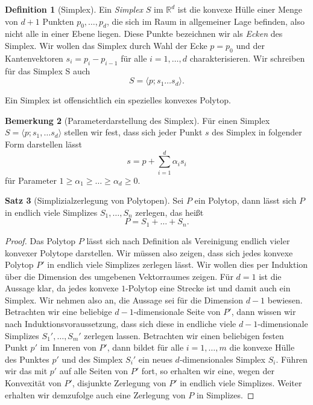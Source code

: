 \documentclass[11pt,titlepage]{article}
\newcommand{\setR}{\mathbb{R}}
\theoremstyle{definition}
\newtheorem{theorem}{Satz}[section]
\newtheorem{definition}[theorem]{Definition}
\newtheorem{remark}[theorem]{Bemerkung}
\theoremstyle{remark}
\begin{document}
	\begin{definition}[Simplex]\label{def:simplex}
		Ein \textsl{Simplex} $S$ im $\setR^d$ ist die konvexe Hülle einer Menge von 
		$d+1$ Punkten 
		$p_0,\ldots,p_d$, die sich im Raum in allgemeiner Lage befinden, also 
		nicht alle in einer Ebene liegen. Diese Punkte bezeichnen wir als 
		\textsl{Ecken} des Simplex. Wir wollen das Simplex durch Wahl der 
		Ecke $p=p_0$ und der Kantenvektoren 
		$s_i=p_i -p_{i-1}$ für alle $i=1,\ldots,d$ charakterisieren. 
		Wir schreiben für das Simplex S auch
		\[S=\langle p;s_1\ldots s_d\rangle.\]
	\end{definition}
	
	Ein Simplex ist offensichtlich ein spezielles konvexes Polytop. 
	
	\begin{remark}[Parameterdarstellung des Simplex]\label{bem:paradarst;simplex}
		Für einen Simplex $S=\langle p;s_1,\ldots s_d\rangle$ stellen wir 
		fest, dass sich jeder Punkt $s$ des Simplex in folgender Form darstellen 
		lässt
		\[s=p+\sum_{i=1}^d \alpha_i s_i\]
		für Parameter $1\geq \alpha_1\geq\ldots\geq\alpha_d\geq 0$. 
	\end{remark}
	
	\begin{theorem}[Simplizialzerlegung von Polytopen]\label{thm:simplzerl}
		Sei $P$ ein Polytop, dann lässt sich $P$ in endlich viele 
		Simplizes $S_1,\ldots,S_n$ zerlegen, das heißt
		\[P=S_1+\ldots+S_n.\]
	\end{theorem}
	
	\begin{proof}
		Das Polytop $P$ lässt sich nach Definition als Vereinigung endlich 
		vieler konvexer Polytope darstellen. Wir müssen also 
		zeigen, dass sich jedes konvexe Polytop $P'$ in endlich viele Simplizes 
		zerlegen lässt. Wir wollen dies per Induktion über die Dimension 
		des umgebenen Vektorraumes zeigen. Für $d=1$ ist die Aussage klar, da 
		jedes konvexe $1$-Polytop eine Strecke ist und damit auch ein 
		Simplex. Wir nehmen also an, die Aussage sei für die Dimension $d-1$ 
		bewiesen. Betrachten wir eine beliebige $d-1$-dimensionale Seite von 
		$P'$, dann wissen wir nach Induktionsvoraussetzung, dass sich diese  
		in endliche viele $d-1$-dimensionale Simplizes $S_1',\ldots,S_m'$ 
		zerlegen lassen. 
		Betrachten wir einen beliebigen festen Punkt $p'$ im Inneren von $P'$, dann 
		bildet für alle $i=1,\ldots,m$ die konvexe Hülle des Punktes $p'$ und 
		des Simplex $S_i'$ ein 
		neues $d$-dimensionales Simplex $S_i$. Führen wir das mit $p'$ auf 
		alle Seiten 
		von $P'$ fort, so erhalten wir eine, wegen der Konvexität 
		von $P'$, disjunkte 
		Zerlegung von $P'$ in endlich viele 
		Simplizes. Weiter erhalten wir demzufolge auch eine Zerlegung von 
		$P$ in Simplizes.
	\end{proof}
	
\end{document}
